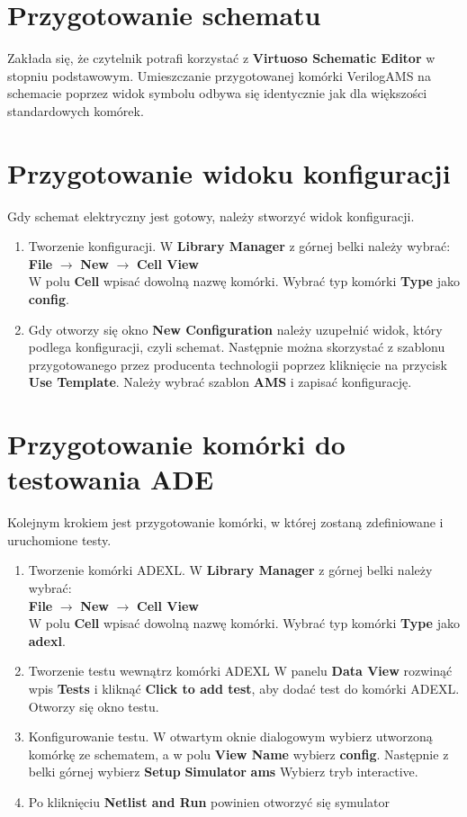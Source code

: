 \documentclass[10pt,a4paper,twoside]{report}
\theoremstyle{definition}
\theoremstyle{definition}
\theoremstyle{definition}
\theoremstyle{definition}
\theoremstyle{definition}
\begin{document}
{{{{{{{{	\section{Przygotowanie schematu}
	{	Zakłada się, że czytelnik potrafi korzystać z \textbf{Virtuoso Schematic Editor} w stopniu podstawowym. Umieszczanie przygotowanej komórki VerilogAMS na schemacie poprzez widok symbolu odbywa się identycznie jak dla większości standardowych komórek.}
	\section{Przygotowanie widoku konfiguracji}
	{	Gdy schemat elektryczny jest gotowy, należy stworzyć widok konfiguracji.}
	\begin{enumerate}
		\item Tworzenie konfiguracji.
			W \textbf{Library Manager} z górnej belki należy wybrać: \\ 
		\textbf{File} $\rightarrow$ \textbf{New} $\rightarrow$ \textbf{Cell View} \\
		\subitem W polu \textbf{Cell} wpisać dowolną nazwę komórki.
		\subitem Wybrać typ komórki \textbf{Type} jako \textbf{config}.
		\item Gdy otworzy się okno \textbf{New Configuration} należy uzupełnić widok, który podlega konfiguracji, czyli schemat. Następnie można skorzystać z szablonu przygotowanego przez producenta technologii poprzez kliknięcie na przycisk \textbf{Use Template}. Należy wybrać szablon \textbf{AMS} i zapisać konfigurację.
	\end{enumerate}

	\section{Przygotowanie komórki do testowania ADE}
	{	Kolejnym krokiem jest przygotowanie komórki, w której zostaną zdefiniowane i uruchomione testy.}
	\begin{enumerate}
		\item Tworzenie komórki ADEXL.
		W \textbf{Library Manager} z górnej belki należy wybrać: \\ 
		\textbf{File} $\rightarrow$ \textbf{New} $\rightarrow$ \textbf{Cell View} \\
		\subitem W polu \textbf{Cell} wpisać dowolną nazwę komórki.
		\subitem Wybrać typ komórki \textbf{Type} jako \textbf{adexl}.
		\item Tworzenie testu wewnątrz komórki ADEXL
		W panelu \textbf{Data View} rozwinąć wpis \textbf{Tests} i kliknąć \textbf{Click to add test}, aby dodać test do komórki ADEXL. Otworzy się okno testu.
		\item Konfigurowanie testu.
		\subitem W otwartym oknie dialogowym wybierz utworzoną komórkę ze schematem, a w polu \textbf{View Name} wybierz \textbf{config}.
		\subitem Następnie z belki górnej wybierz \textbf{Setup} \textbf{Simulator} \textbf{ams}
		\subitem Wybierz tryb interactive.
		\item Po kliknięciu \textbf{Netlist and Run} powinien otworzyć się symulator		
	\end{enumerate}

}}}}}}}}
\end{document}
